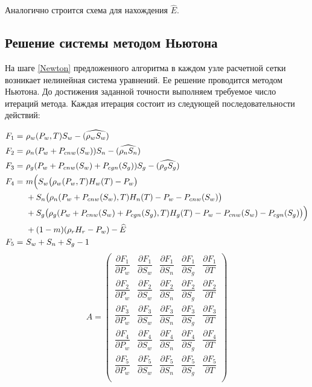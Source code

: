 Аналогично строится схема для нахождения $\widehat{E}$.

\newpage
\subsection{Решение системы методом Ньютона} На шаге \ref{Newton}
предложенного алгоритма в каждом узле расчетной сетки возникает 
нелинейная система уравнений.
Ее решение проводится методом Ньютона\cite{Kalitkin}.
До достижения заданной точности выполняем требуемое число итераций метода. Каждая итерация 
состоит из следующей последовательности действий:

\begin{eqnarray*}
  \begin{aligned}
    F_1=\ &\rho_w(P_w, T) S_w - (\widehat{\rho_w S_w}) \\
    F_2=\ &\rho_n(P_w+P_{cnw}(S_w)) S_n - (\widehat{\rho_n S_n}) \\
    F_3=\ &\rho_g(P_w+P_{cnw}(S_w)+P_{cgn}(S_g)) S_g - (\widehat{\rho_g S_g}) \\
    F_4=\ & m \Big{(}S_w \big{(}\rho_w(P_w, T) H_w(T) - P_w\big{)} \\
	 &+ S_n \big{(}\rho_n(P_w+P_{cnw}(S_w), T) H_n(T) - P_w - P_{cnw}(S_w)\big{)} \\
	 &+ S_g \big{(}\rho_g(P_w+P_{cnw}(S_w)+P_{cgn}(S_g), T) H_g(T) - P_w - P_{cnw}(S_w) - P_{cgn}(S_g)\big{)}
	 \Big{)}\\
	 &+ (1-m) (\rho_r H_r - P_w) - \widehat{E} \\
    F_5=\ &S_w+S_n+S_g - 1
  \end{aligned}
\end{eqnarray*}
\begin{equation}
A=
\begin{pmatrix}
\dfrac{\partial{F_1}}{\partial{P_w}} & \dfrac{\partial{F_1}}{\partial{S_w}} & \dfrac{\partial{F_1}}{\partial{S_n}} & \dfrac{\partial{F_1}}{\partial{S_g}} & \dfrac{\partial{F_1}}{\partial{T}}\\[3mm]
\dfrac{\partial{F_2}}{\partial{P_w}} & \dfrac{\partial{F_2}}{\partial{S_w}} & \dfrac{\partial{F_2}}{\partial{S_n}} & \dfrac{\partial{F_2}}{\partial{S_g}} & \dfrac{\partial{F_2}}{\partial{T}}\\[3mm]
\dfrac{\partial{F_3}}{\partial{P_w}} & \dfrac{\partial{F_3}}{\partial{S_w}} & \dfrac{\partial{F_3}}{\partial{S_n}} & \dfrac{\partial{F_3}}{\partial{S_g}} & \dfrac{\partial{F_3}}{\partial{T}}\\[3mm]
\dfrac{\partial{F_4}}{\partial{P_w}} & \dfrac{\partial{F_4}}{\partial{S_w}} & \dfrac{\partial{F_4}}{\partial{S_n}} & \dfrac{\partial{F_4}}{\partial{S_g}} & \dfrac{\partial{F_4}}{\partial{T}}\\[3mm]
\dfrac{\partial{F_5}}{\partial{P_w}} & \dfrac{\partial{F_5}}{\partial{S_w}} & \dfrac{\partial{F_5}}{\partial{S_n}} & \dfrac{\partial{F_5}}{\partial{S_g}} & \dfrac{\partial{F_5}}{\partial{T}}\\[3mm]
\end{pmatrix}
\end{equation}

